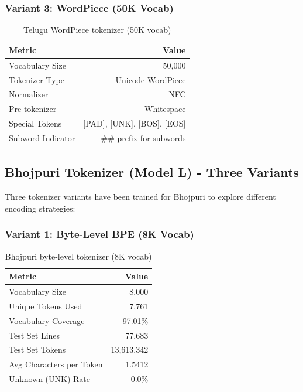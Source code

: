 \documentclass[11pt,a4paper]{article}
\begin{document}
\subsubsection{Variant 3: WordPiece (50K Vocab)}

\begin{table}[H]
    \centering
    \small
    \begin{tabular}{|l|r|}
    \hline
    \textbf{Metric} & \textbf{Value} \\
    \hline
    Vocabulary Size & 50,000 \\
    Tokenizer Type & Unicode WordPiece \\
    Normalizer & NFC \\
    Pre-tokenizer & Whitespace \\
    \hline
    Special Tokens & {[}PAD{]}, {[}UNK{]}, {[}BOS{]}, {[}EOS{]} \\
    Subword Indicator & ## prefix for subwords \\
    \hline
    \end{tabular}
    \caption{Telugu WordPiece tokenizer (50K vocab)}
    \label{tab:tokenizer_telugu_wp}
\end{table}

\subsection{Bhojpuri Tokenizer (Model L) - Three Variants}

Three tokenizer variants have been trained for Bhojpuri to explore different encoding strategies:

\subsubsection{Variant 1: Byte-Level BPE (8K Vocab)}

\begin{table}[H]
    \centering
    \small
    \begin{tabular}{|l|r|}
    \hline
    \textbf{Metric} & \textbf{Value} \\
    \hline
    Vocabulary Size & 8,000 \\
    Unique Tokens Used & 7,761 \\
    Vocabulary Coverage & 97.01\% \\
    \hline
    Test Set Lines & 77,683 \\
    Test Set Tokens & 13,613,342 \\
    Avg Characters per Token & 1.5412 \\
    Unknown (UNK) Rate & 0.0\% \\
    \hline
    \end{tabular}
    \caption{Bhojpuri byte-level tokenizer (8K vocab)}
    \label{tab:tokenizer_bhojpuri_byte}
\end{table}
\end{document}
